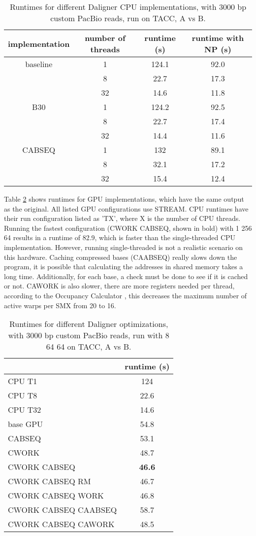 \documentclass[../thesis.tex]{subfiles}
\begin{document}
\begin{table}
\centering
\caption{Runtimes for different Daligner CPU implementations, with 3000 bp custom PacBio reads, run on TACC, A vs B.}
\label{tbl:daligner1}
\begin{tabular}{c c c c}
implementation & number of threads & runtime (s) & runtime with NP (s) \\ \hline
baseline & 1 & 124.1 & 92.0 \\
& 8 & 22.7 & 17.3 \\
& 32 & 14.6 & 11.8 \\ \hline
B30 & 1 & 124.2 & 92.5 \\
& 8 & 22.7 & 17.4 \\
& 32 & 14.4 & 11.6 \\ \hline
CABSEQ & 1 & 132 & 89.1 \\
& 8 & 32.1 & 17.2 \\
& 32 & 15.4 & 12.4 \\
\end{tabular}
\end{table}

Table \ref{tbl:daligner2} shows runtimes for GPU implementations, which have the same output as the original.
All listed GPU configurations use STREAM.
CPU runtimes have their run configuration listed as 'TX', where X is the number of CPU threads.
Running the fastest configuration (CWORK CABSEQ, shown in bold) with 1 256 64 results in a runtime of 82.9, which is faster than the single-threaded CPU implementation.
However, running single-threaded is not a realistic scenario on this hardware.
Caching compressed bases (CAABSEQ) really slows down the program, it is possible that calculating the addresses in shared memory takes a long time.
Additionally, for each base, a check must be done to see if it is cached or not.
CAWORK is also slower, there are more registers needed per thread, according to the Occupancy Calculator \cite{occupancy_calculator}, this decreases the maximum number of active warps per SMX from 20 to 16.


\begin{table}
\centering
\caption{Runtimes for different Daligner optimizations, with 3000 bp custom PacBio reads, run with 8 64 64 on TACC, A vs B.}
\label{tbl:daligner2}
\begin{tabular}{l c}
& runtime (s) \\ \hline
CPU T1 & 124 \\
CPU T8 & 22.6 \\
CPU T32 & 14.6 \\ \hline
base GPU & 54.8 \\ 
CABSEQ & 53.1 \\
CWORK & 48.7 \\
CWORK CABSEQ & \textbf{46.6} \\
CWORK CABSEQ RM & 46.7 \\
CWORK CABSEQ WORK & 46.8 \\
CWORK CABSEQ CAABSEQ & 58.7 \\
CWORK CABSEQ CAWORK & 48.5 \\
\end{tabular}
\end{table}
\end{document}
